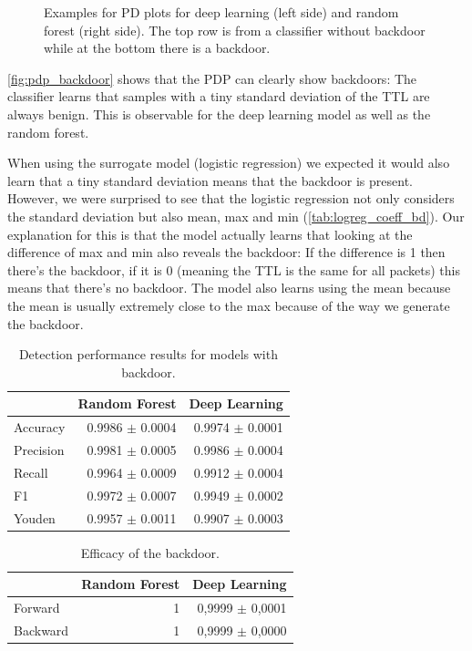\documentclass[10pt,sigconf,letterpaper,dvipsnames]{acmart}
\begin{document}
\begin{figure}[p]

\caption{Examples for PD plots for deep learning (left side) and random forest (right side). The top row is from a classifier without backdoor while at the bottom there is a backdoor.}
\label{fig:pdp_backdoor}
\end{figure}

\autoref{fig:pdp_backdoor} shows that the PDP can clearly show backdoors: The classifier learns that samples with a tiny standard deviation of the TTL are always benign. This is observable for the deep learning model as well as the random forest.

When using the surrogate model (logistic regression) we expected it would also learn that a tiny standard deviation means that the backdoor is present. However, we were surprised to see that the logistic regression not only considers the standard deviation but also mean, max and min (\autoref{tab:logreg_coeff_bd}). Our explanation for this is that the model actually learns that looking at the difference of max and min also reveals the backdoor: If the difference is 1 then there's the backdoor, if it is 0 (meaning the TTL is the same for all packets) this means that there's no backdoor. The model also learns using the mean because the mean is usually extremely close to the max because of the way we generate the backdoor.

\begin{table}
\caption{Detection performance results for models with backdoor.}
\label{tab:performance_results_bd}
\begin{tabular}{l r r} \toprule
& Random Forest & Deep Learning \\ \midrule
Accuracy	&	0.9986 $\pm$ 0.0004	&	0.9974 $\pm$ 0.0001		\\
Precision	&	0.9981 $\pm$ 0.0005	&	0.9986 $\pm$ 0.0004		\\
Recall	&	0.9964 $\pm$ 0.0009	&	0.9912 $\pm$ 0.0004		\\
F1	&	0.9972 $\pm$ 0.0007	&	0.9949 $\pm$ 0.0002		\\
Youden	&	0.9957 $\pm$ 0.0011	&	0.9907 $\pm$ 0.0003		\\
\bottomrule
\end{tabular}
\end{table}


\begin{table}
\caption{Efficacy of the backdoor.}
\begin{tabular}{l r r} \toprule
 & Random Forest & Deep Learning \\ \midrule
Forward & 1 & 0,9999 $\pm$ 0,0001 \\
Backward & 1 & 0,9999 $\pm$ 0,0000 \\
\bottomrule
\end{tabular}
\end{table}
\end{document}
